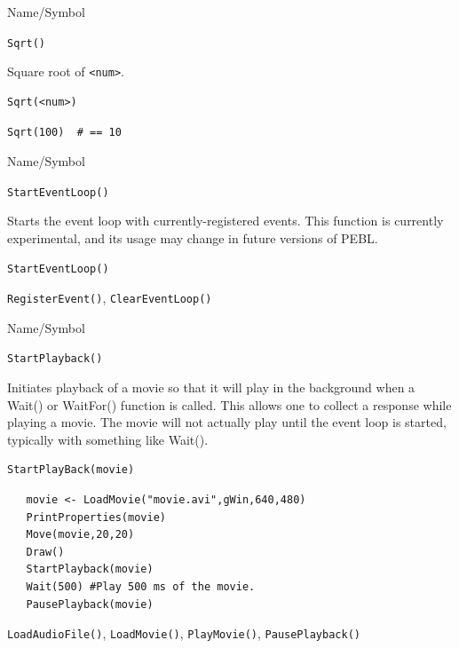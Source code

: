 \begin{desc}{Name/Symbol}
\item[Name/Symbol]  	\verb+Sqrt()+ 

\item[Description]  	Square root of \verb+<num>+.

\item[Usage]        	
\begin{verbatim}
Sqrt(<num>)
\end{verbatim}

\item[Example]
\begin{verbatim}
Sqrt(100)  # == 10
\end{verbatim}

\item[See Also]	
\end{desc}


\begin{desc}{Name/Symbol}
\item[Name/Symbol]  	\verb+StartEventLoop()+ 

\item[Description]  Starts the event loop with currently-registered events.  This function is currently experimental, and its usage may change in future versions of PEBL.

\item[Usage]       	
\begin{verbatim}
StartEventLoop()        
\end{verbatim}

\item[Example]	

\item[See Also] 
\verb+RegisterEvent()+, \verb+ClearEventLoop()+
\end{desc}


\begin{desc}{Name/Symbol}
\item[Name/Symbol]	\verb+StartPlayback()+
 
\item[Description] Initiates playback of a movie so that it will play in the background
when a Wait() or WaitFor() function is called.  This allows one to collect a response while 
playing a movie.  The movie will not actually play until the event loop is started, typically
with something like Wait().

\item[Usage]		
\begin{verbatim}
StartPlayBack(movie)
\end{verbatim}

\item[Example]	
\begin{verbatim}
   movie <- LoadMovie("movie.avi",gWin,640,480)
   PrintProperties(movie)
   Move(movie,20,20)
   Draw() 
   StartPlayback(movie)
   Wait(500) #Play 500 ms of the movie.
   PausePlayback(movie)
\end{verbatim}

\item[See Also] \verb+LoadAudioFile()+, \verb+LoadMovie()+, \verb+PlayMovie()+, \verb+PausePlayback()+
\end{desc}




